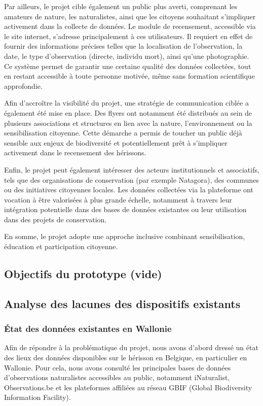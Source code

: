 \documentclass[a4paper,11pt]{article}
\begin{document}
Par ailleurs, le projet cible également un public plus averti, comprenant les amateurs de nature, les naturalistes, ainsi que les citoyens souhaitant s’impliquer activement dans la collecte de données. Le module de recensement, accessible via le site internet, s’adresse principalement à ces utilisateurs. Il requiert en effet de fournir des informations précises telles que la localisation de l’observation, la date, le type d’observation (directe, individu mort), ainsi qu’une photographie. Ce système permet de garantir une certaine qualité des données collectées, tout en restant accessible à toute personne motivée, même sans formation scientifique approfondie.

Afin d’accroître la visibilité du projet, une stratégie de communication ciblée a également été mise en place. Des flyers ont notamment été distribués au sein de plusieurs associations et structures en lien avec la nature, l’environnement ou la sensibilisation citoyenne. Cette démarche a permis de toucher un public déjà sensible aux enjeux de biodiversité et potentiellement prêt à s’impliquer activement dans le recensement des hérissons.

Enfin, le projet peut également intéresser des acteurs institutionnels et associatifs, tels que des organisations de conservation (par exemple Natagora), des communes ou des initiatives citoyennes locales. Les données collectées via la plateforme ont vocation à être valorisées à plus grande échelle, notamment à travers leur intégration potentielle dans des bases de données existantes ou leur utilisation dans des projets de conservation.

En somme, le projet adopte une approche inclusive combinant sensibilisation, éducation et participation citoyenne.

\subsection{Objectifs du prototype (vide)}

\subsection{Analyse des lacunes des dispositifs existants}

\subsubsection{État des données existantes en Wallonie}

Afin de répondre à la problématique du projet, nous avons d’abord dressé un état des lieux des données disponibles sur le hérisson en Belgique, en particulier en Wallonie. Pour cela, nous avons consulté les principales bases de données d'observations naturalistes accessibles au public, notamment iNaturalist, Observations.be et les plateformes affiliées au réseau GBIF (Global Biodiversity Information Facility).
\end{document}

